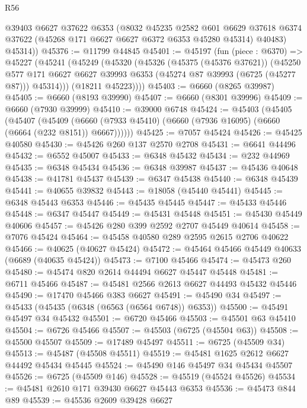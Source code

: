 \begin{lexlean}{R56}
\begin{coremodule}
        @39403
        @6627
        @37622
        @6353
        (@8032
          @45235
          @2582
          @601
          @6629
          @37618
          @6374
          @37622
          (@45268 @171 @6627 @6627 @6372 @6353 @45280 @45314)
          @40483)
        @45314))
@45376 := @11799 @44845
@45401 := @45197
    (fun (piece : @6370) =>
    @45227
      (@45241
        (@45249
          (@45320
            (@45326
              (@45375 (@45376 @37621))
              (@45250
                @577
                @171
                @6627
                @6627
                @39993
                @6353
                (@45274 @87 @39993 (@6725 (@45277 @87)))
                @45314)))
          (@18211 @45223))))
@45403 := @6660 (@8265 @39987)
@45405 := @6660 (@8193 @39990)
@45407 := @6660 (@8301 @39996)
@45409 := @6660 (@7930 @39999)
@45410 := @39000 @6748
@45424 := @45403
    (@45405
      (@45407
        (@45409 (@6660 (@7933 @45410) (@6660 (@7936 @16095) (@6660 (@6664 (@232 @8151)) @6667))))))
@45425 := @7057 @45424
@45426 := @45425 @40580
@45430 := @45426 @260 @137 @2570 @2708
@45431 := @6641 @44496
@45432 := @6552 @45007
@45433 := @6348 @45432
@45434 := @232 @44969
@45435 := @6348 @45434
@45436 := @6348 @39987
@45437 := @45436 @40648
@45438 := @41781 @45437
@45439 := @6347 @45438
@45440 := @6348 @45439
@45441 := @40655 @39832
@45443 := @18058 (@45440 @45441)
@45445 := @6348 @45443 @6353
@45446 := @45435 @45445
@45447 := @45433 @45446
@45448 := @6347 @45447
@45449 := @45431 @45448
@45451 := @45430 @45449 @40606
@45457 := @45426 @280 @399 @2592 @2707 @45449 @40614
@45458 := @7076 @45424
@45464 := @45458 @40580 @289 @2595 @2615 @2706 @40622
@45466 := @40625 (@40627 @45424)
@45472 := @45464 @45466 @45449 @40633 (@6689 (@40635 @45424))
@45473 := @7100 @45466
@45474 := @45473 @260
@45480 := @45474 @820 @2614 @44494 @6627 @45447 @45448
@45481 := @6711 @45466
@45487 := @45481 @2566 @2613 @6627 @44493 @45432 @45446
@45490 := @17470 @45466 @383 @6627
@45491 := @45490 @34
@45497 := @45433 (@45435 (@6348 (@6563 (@6564 @6748)) @6353))
@45500 := @45491 @45497 @34 @45432
@45501 := @6720 @45466
@45503 := @45501 @63 @45410
@45504 := @6726 @45466
@45507 := @45503 (@6725 (@45504 @63))
@45508 := @45500 @45507
@45509 := @17489 @45497
@45511 := @6725 (@45509 @34)
@45513 := @45487 (@45508 @45511)
@45519 := @45481 @1625 @2612 @6627 @44492 @45434 @45445
@45524 := @45490 @146 @45497 @34 @45434 @45507
@45526 := @6725 (@45509 @146)
@45528 := @45519 (@45524 @45526)
@45534 := @45481 @2610 @171 @39430 @6627 @45443 @6353
@45536 := @45473 @844 @89
@45539 := @45536 @2609 @39428 @6627

\end{coremodule}
\end{lexlean}
